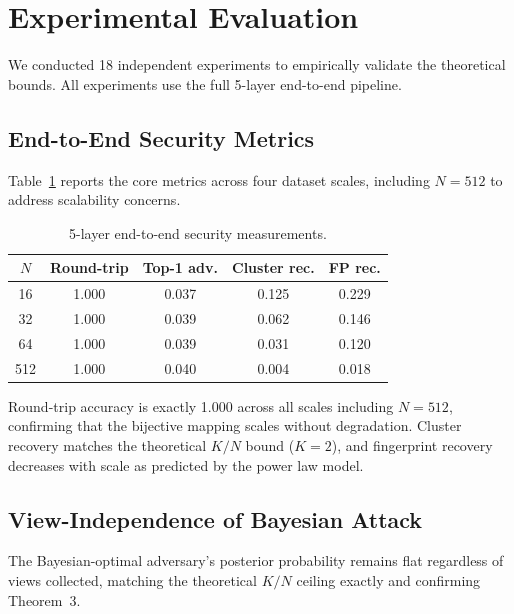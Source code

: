 \documentclass[11pt]{article}
\begin{document}
\section{Experimental Evaluation}
\label{sec:experiments}

We conducted 18 independent experiments to empirically validate the theoretical bounds. All experiments use the full 5-layer end-to-end pipeline.

\subsection{End-to-End Security Metrics}

Table~\ref{tab:e2e} reports the core metrics across four dataset scales, including $N=512$ to address scalability concerns.

\begin{table}[t]
\centering
\caption{5-layer end-to-end security measurements.}
\label{tab:e2e}
\begin{tabular}{@{}ccccc@{}}
\toprule
$N$ & Round-trip & Top-1 adv. & Cluster rec. & FP rec. \\
\midrule
16  & 1.000 & 0.037 & 0.125 & 0.229 \\
32  & 1.000 & 0.039 & 0.062 & 0.146 \\
64  & 1.000 & 0.039 & 0.031 & 0.120 \\
512 & 1.000 & 0.040 & 0.004 & 0.018 \\
\bottomrule
\end{tabular}
\end{table}

Round-trip accuracy is exactly 1.000 across all scales including $N=512$, confirming that the bijective mapping scales without degradation. Cluster recovery matches the theoretical $K/N$ bound ($K=2$), and fingerprint recovery decreases with scale as predicted by the power law model.

\subsection{View-Independence of Bayesian Attack}

The Bayesian-optimal adversary's posterior probability remains flat regardless of views collected, matching the theoretical $K/N$ ceiling exactly and confirming Theorem~3.
\end{document}
